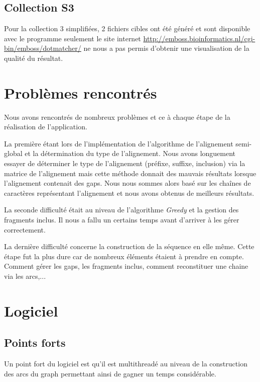 \documentclass[12pt,a4paper,final]{article}
\begin{document}
\subsection{Collection S3}
Pour la collection 3 simplifiées, 2 fichiers cibles ont été généré et sont disponible avec le programme seulement le site internet \url{http://emboss.bioinformatics.nl/cgi-bin/emboss/dotmatcher/} ne nous a pas permis d'obtenir une visualisation de la qualité du résultat.

\newpage
\section{Problèmes rencontrés}

Nous avons rencontrés de nombreux problèmes et ce à chaque étape de la réalisation de l'application.\medskip

La première étant lors de l'implémentation de l'algorithme de l'alignement semi-global et la détermination du type de l'alignement.  Nous avons longuement essayer de déterminer le type de l'alignement (préfixe, suffixe, inclusion) via la matrice de l'alignement mais cette méthode donnait des mauvais résultats lorsque l'alignement contenait des gaps.  Nous nous sommes alors basé sur les chaînes de caractères représentant l'alignement et nous avons obtenus de meilleurs résultats.\medskip

La seconde difficulté était au niveau de l'algorithme \textit{Greedy} et la gestion des fragments inclus.  Il nous a fallu un certains temps avant d'arriver à les gérer correctement.\medskip

La dernière difficulté concerne la construction de la séquence en elle même.  Cette étape fut la plus dure car de nombreux éléments étaient à prendre en compte.  Comment gérer les gaps, les fragments inclus, comment reconstituer une chaine via les arcs,...

\newpage
\section{Logiciel}

\subsection{Points forts}

Un point fort du logiciel est qu'il est multithreadé au niveau de la construction des arcs du graph permettant ainsi de gagner un temps considérable.
\end{document}
